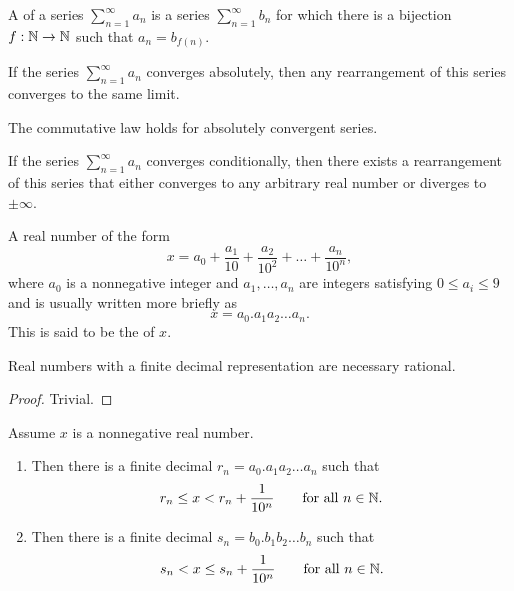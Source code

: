 \begin{definition}
  A  of a series $\sum_{n = 1}^{\infty} a_n$ is
  a series $\sum_{n = 1}^{\infty} b_n$ for which there is a bijection
  $f : \mathbb N \to \mathbb N$ such that $a_n = b_{f(n)}$.
\end{definition}

\begin{theorem}
  If the series $\sum_{n = 1}^{\infty} a_n$ converges absolutely,
  then any rearrangement of this series converges to the same limit.
\end{theorem}

\begin{corollary}
  The commutative law holds for absolutely convergent series.
\end{corollary}

\begin{theorem}
  If the series $\sum_{n = 1}^{\infty} a_n$ converges conditionally,
  then there exists a rearrangement of this series that either
  converges to any arbitrary real number or diverges to $\pm \infty$.
\end{theorem}

\begin{definition}
  A real number of the form
  \[ x = a_0 + \frac{a_1}{10} + \frac{a_2}{10^2} + \dots + \frac{a_n}{10^n}, \]
  where $a_0$ is a nonnegative integer and $a_1, \dots, a_n$ are
  integers satisfying $0 \leq a_i \leq 9$ and is usually written more briefly as
  \[ x = a_0. a_1 a_2 \ldots a_n. \]
  This is said to be the  of $x$.
\end{definition}

\begin{proposition}
  Real numbers with a finite decimal representation are necessary rational.
\end{proposition}

\begin{proof}
  Trivial.
\end{proof}

\begin{proposition}
  Assume $x$ is a nonnegative real number.
  \begin{enumerate}
    \item Then there is a finite decimal $r_n = a_0. a_1 a_2 \ldots
      a_n$ such that
      \[ r_n \leq x < r_n + \frac{1}{10^n} \qquad \text{for all $n \in \mathbb N$}. \]
    \item Then there is a finite decimal $s_n = b_0. b_1 b_2 \ldots
      b_n$ such that
      \[ s_n < x \leq s_n + \frac{1}{10^n} \qquad \text{for all $n \in \mathbb N$}. \]
  \end{enumerate}
\end{proposition}


